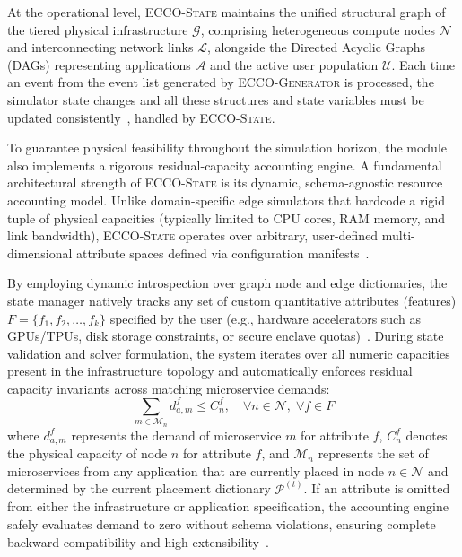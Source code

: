 \documentclass[ASNA]{USG} %
\begin{document}
At the operational level, \textsc{ECCO-State} maintains the unified structural graph of the tiered physical infrastructure $\mathcal{G}$, comprising heterogeneous compute nodes $\mathcal{N}$ and interconnecting network links $\mathcal{L}$, alongside the Directed Acyclic Graphs (DAGs) representing applications $\mathcal{A}$ and the active user population $\mathcal{U}$. Each time an event from the event list generated by \textsc{ECCO-Generator} is processed, the simulator state changes and all these structures and state variables must be updated consistently~\cite{Appuhamilage2025A}, handled by \textsc{ECCO-State}.


To guarantee physical feasibility throughout the simulation horizon, the module also implements a rigorous residual-capacity accounting engine. A fundamental architectural strength of \textsc{ECCO-State} is its dynamic, schema-agnostic resource accounting model. Unlike domain-specific edge simulators that hardcode a rigid tuple of physical capacities (typically limited to CPU cores, RAM memory, and link bandwidth), \textsc{ECCO-State} operates over arbitrary, user-defined multi-dimensional attribute spaces defined via configuration manifests~\cite{Reidys2025Coach}.


By employing dynamic introspection over graph node and edge dictionaries, the state manager natively tracks any set of custom quantitative attributes (features) $F = \{f_1, f_2, \dots, f_k\}$ specified by the user (e.g., hardware accelerators such as GPUs/TPUs, disk storage constraints, or secure enclave quotas)~\cite{Qiu2025Cloud}. During state validation and solver formulation, the system iterates over all numeric capacities present in the infrastructure topology and automatically enforces residual capacity invariants across matching microservice demands:
\begin{equation}
    \sum_{m \in \mathcal{M}_n} d_{a,m}^f \le C_n^f, \quad \forall n \in \mathcal{N}, \; \forall f \in F
\end{equation}
where $d_{a,m}^f$ represents the demand of microservice $m$ for attribute $f$, $C_n^f$ denotes the physical capacity of node $n$ for attribute $f$, and $\mathcal{M}_n$ represents the set of microservices from any application that are currently placed in node $n \in \mathcal{N}$ and determined by the current placement dictionary $\mathcal{P}^{(t)}$. If an attribute is omitted from either the infrastructure or application specification, the accounting engine safely evaluates demand to zero without schema violations, ensuring complete backward compatibility and high extensibility~\cite{Zakarya2019Modelling}.
\end{document}
